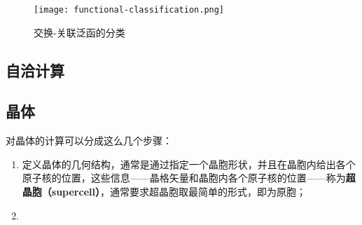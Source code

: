 \documentclass[hyperref, UTF8, a4paper]{ctexart}
\begin{document}
\begin{figure}
    \centering
    \texttt{[image: functional-classification.png]}
    \caption{交换-关联泛函的分类}
    \label{fig:excahnge-correlation-functional}
\end{figure}

\subsection{自洽计算}



\subsection{晶体}

对晶体的计算可以分成这么几个步骤：
\begin{enumerate}
    \item 定义晶体的几何结构，通常是通过指定一个晶胞形状，并且在晶胞内给出各个原子核的位置，这些信息——晶格矢量和晶胞内各个原子核的位置——称为\textbf{超晶胞（supercell）}，通常要求超晶胞取最简单的形式，即为原胞；
    \item 
\end{enumerate}
\end{document}
